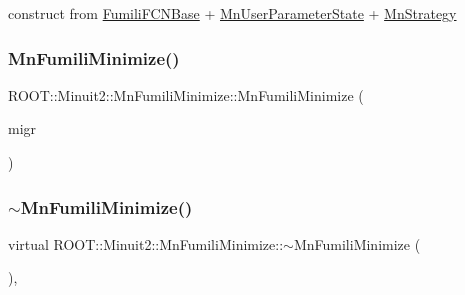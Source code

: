 construct from \mbox{\hyperlink{classROOT_1_1Minuit2_1_1FumiliFCNBase}{Fumili\+F\+C\+N\+Base}} + \mbox{\hyperlink{classROOT_1_1Minuit2_1_1MnUserParameterState}{Mn\+User\+Parameter\+State}} + \mbox{\hyperlink{classROOT_1_1Minuit2_1_1MnStrategy}{Mn\+Strategy}} 

\mbox{\label{classROOT_1_1Minuit2_1_1MnFumiliMinimize_a082eb87753b71a4d383ff8d735dc8410}} 
\subsubsection{\texorpdfstring{MnFumiliMinimize()}{MnFumiliMinimize()}\hspace{0.1cm}{\footnotesize\ttfamily [7/21]}}
{\footnotesize\ttfamily R\+O\+O\+T\+::\+Minuit2\+::\+Mn\+Fumili\+Minimize\+::\+Mn\+Fumili\+Minimize (\begin{DoxyParamCaption}\item[{const \mbox{\hyperlink{classROOT_1_1Minuit2_1_1MnFumiliMinimize}{Mn\+Fumili\+Minimize}} \&}]{migr }\end{DoxyParamCaption})\hspace{0.3cm}{\ttfamily [inline]}}

\mbox{\label{classROOT_1_1Minuit2_1_1MnFumiliMinimize_ab999713e15397b9373551207f05786c5}} 
\subsubsection{\texorpdfstring{$\sim$MnFumiliMinimize()}{~MnFumiliMinimize()}\hspace{0.1cm}{\footnotesize\ttfamily [1/3]}}
{\footnotesize\ttfamily virtual R\+O\+O\+T\+::\+Minuit2\+::\+Mn\+Fumili\+Minimize\+::$\sim$\+Mn\+Fumili\+Minimize (\begin{DoxyParamCaption}{ }\end{DoxyParamCaption})\hspace{0.3cm}{\ttfamily [inline]}, {\ttfamily [virtual]}}

